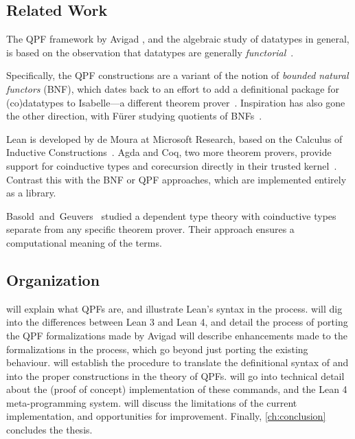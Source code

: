 \subsection*{Related Work}
The QPF framework by Avigad \etal{}, and the algebraic study of datatypes in general, is based on the observation that datatypes are generally \emph{functorial}~\cite{avigadDataTypesQuotients2019a}.

Specifically, the QPF constructions are a variant of the notion of \emph{bounded natural functors} (BNF), 
which dates back to an effort to add a definitional package for (co)datatypes to Isabelle---a different theorem prover~\cite{biendarraDefiningCoDatatypes,traytelCategoryTheoryBased}.
Inspiration has also gone the other direction, with Fürer \etal{} studying quotients of BNFs~\cite{furerQuotientsBoundedNatural2022}.


Lean is developed by de Moura \etal{} at Microsoft Research, based on the Calculus of Inductive Constructions~\cite{demouraLeanTheoremProver2015,coquandMetamathematicalInvestigationsCalculus1989}.
Agda and Coq, two more theorem provers, provide support
for coinductive types and corecursion directly in their trusted kernel~\cite{gimenezApplicationCoinductiveTypes1996,gimenezTutorialRecursiveTypes1998}. Contrast this with the BNF or QPF approaches, which are implemented entirely as a
library.

Basold~and~Geuvers~\cite{basoldMixedInductiveCoinductiveReasoning2018, basoldTypeTheoryBased2016}
studied a dependent type theory with coinductive types separate from any specific theorem prover.
Their approach ensures a computational meaning of the terms.




\subsection*{Organization}
 will explain what QPFs are, and illustrate Lean's syntax in the process.
 will dig into the differences between Lean 3 and Lean 4, and detail the process of porting the QPF formalizations made by Avigad \etal{}
 will describe enhancements made to the formalizations in the process, which go beyond just porting the existing behaviour.
 will establish the procedure to translate the definitional syntax of \data{} and \codata{} into the proper constructions in the theory of QPFs.
 will go into technical detail about the (proof of concept)
implementation of these commands, and the Lean 4 meta-programming system.
 will discuss the limitations of the current implementation, and opportunities for improvement.
Finally, \cref{ch:conclusion} concludes the thesis.

